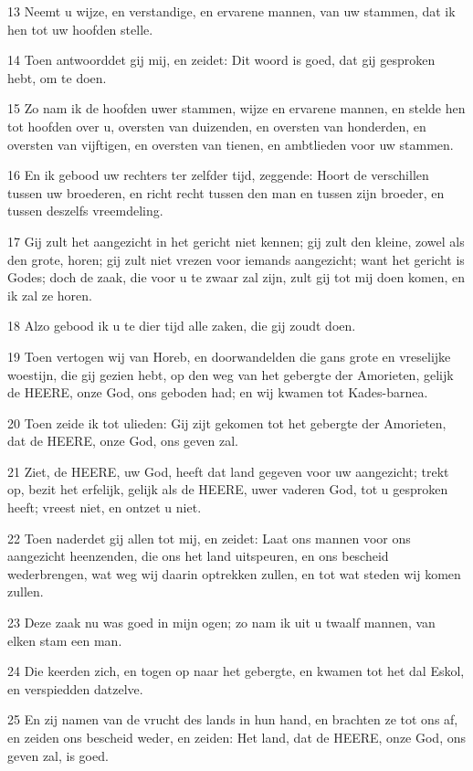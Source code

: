 \par 13 Neemt u wijze, en verstandige, en ervarene mannen, van uw stammen, dat ik hen tot uw hoofden stelle.
\par 14 Toen antwoorddet gij mij, en zeidet: Dit woord is goed, dat gij gesproken hebt, om te doen.
\par 15 Zo nam ik de hoofden uwer stammen, wijze en ervarene mannen, en stelde hen tot hoofden over u, oversten van duizenden, en oversten van honderden, en oversten van vijftigen, en oversten van tienen, en ambtlieden voor uw stammen.
\par 16 En ik gebood uw rechters ter zelfder tijd, zeggende: Hoort de verschillen tussen uw broederen, en richt recht tussen den man en tussen zijn broeder, en tussen deszelfs vreemdeling.
\par 17 Gij zult het aangezicht in het gericht niet kennen; gij zult den kleine, zowel als den grote, horen; gij zult niet vrezen voor iemands aangezicht; want het gericht is Godes; doch de zaak, die voor u te zwaar zal zijn, zult gij tot mij doen komen, en ik zal ze horen.
\par 18 Alzo gebood ik u te dier tijd alle zaken, die gij zoudt doen.
\par 19 Toen vertogen wij van Horeb, en doorwandelden die gans grote en vreselijke woestijn, die gij gezien hebt, op den weg van het gebergte der Amorieten, gelijk de HEERE, onze God, ons geboden had; en wij kwamen tot Kades-barnea.
\par 20 Toen zeide ik tot ulieden: Gij zijt gekomen tot het gebergte der Amorieten, dat de HEERE, onze God, ons geven zal.
\par 21 Ziet, de HEERE, uw God, heeft dat land gegeven voor uw aangezicht; trekt op, bezit het erfelijk, gelijk als de HEERE, uwer vaderen God, tot u gesproken heeft; vreest niet, en ontzet u niet.
\par 22 Toen naderdet gij allen tot mij, en zeidet: Laat ons mannen voor ons aangezicht heenzenden, die ons het land uitspeuren, en ons bescheid wederbrengen, wat weg wij daarin optrekken zullen, en tot wat steden wij komen zullen.
\par 23 Deze zaak nu was goed in mijn ogen; zo nam ik uit u twaalf mannen, van elken stam een man.
\par 24 Die keerden zich, en togen op naar het gebergte, en kwamen tot het dal Eskol, en verspiedden datzelve.
\par 25 En zij namen van de vrucht des lands in hun hand, en brachten ze tot ons af, en zeiden ons bescheid weder, en zeiden: Het land, dat de HEERE, onze God, ons geven zal, is goed.
